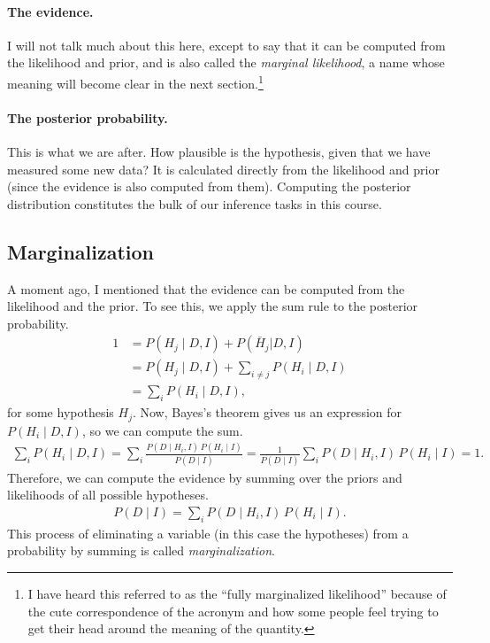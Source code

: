 \paragraph{The evidence.}  I will not talk much about this here,
except to say that it can be computed from the likelihood and prior,
and is also called the \textit{marginal likelihood}, a name whose
meaning will become clear in the next section.\footnote{I have heard this referred to as the ``fully marginalized likelihood'' because of the cute correspondence of the acronym and how some people feel trying to get their head around the meaning of the quantity.}

\paragraph{The posterior probability.} This is what we are after.  How
plausible is the hypothesis, given that we have measured some new
data?  It is calculated directly from the likelihood and prior (since
the evidence is also computed from them).  Computing the posterior
distribution constitutes the bulk of our inference tasks in this course.


\subsection{Marginalization}
A moment ago, I mentioned that the evidence can be computed from the
likelihood and the prior.  To see this, we apply the sum rule to the
posterior probability.
\begin{align}
1 &= P(H_j\mid D,I) + P(\bar{H}_j | D,I) \\
&= P(H_j\mid D,I) + \sum_{i\ne j}P(H_i\mid D,I) \\
&= \sum_iP(H_i\mid D,I),
\end{align}
for some hypothesis $H_j$.  Now, Bayes's theorem gives us an
expression for $P(H_i\mid D, I)$, so we can compute the sum.
\begin{align}
\sum_iP(H_i\mid D,I) = \sum_i\frac{P(D \mid H_i, I)\, P(H_i \mid I)}{P(D \mid I)}
= \frac{1}{P(D\mid I)}\sum_i P(D \mid H_i, I)\, P(H_i \mid I) = 1.
\end{align}
Therefore, we can compute the evidence by summing over the priors and
likelihoods of all possible hypotheses.
\begin{align}
P(D\mid I) = \sum_i P(D \mid H_i, I)\, P(H_i \mid I).
\end{align}
This process of eliminating a variable (in this case the hypotheses)
from a probability by summing is called \textit{marginalization}.

